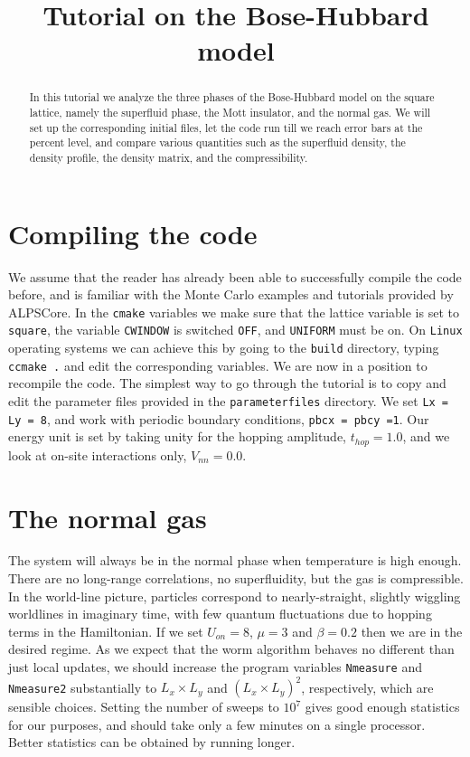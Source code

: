 \documentclass[pra,aps,showpacs,groupedaddress,superscriptaddress,twocolumn,toc=flat]{revtex4-1}
\begin{document}
\title{Tutorial on the Bose-Hubbard model}

\begin{abstract}
In this tutorial we analyze the three phases of the Bose-Hubbard model on the square lattice, namely the superfluid phase, the Mott insulator, and the normal gas.
We will set up the corresponding initial files, let the code run till we reach error bars at the percent level, and compare various quantities such as the superfluid density, the density profile, the density matrix, and the compressibility.


\end{abstract}

\maketitle

\section{Compiling the code}
We assume that the reader has already been able to successfully compile the code before, and is familiar with the Monte Carlo examples and tutorials provided by ALPSCore.
In the \texttt{cmake} variables  we make sure that the lattice variable is set to \texttt{square}, the variable \texttt{CWINDOW} is switched \texttt{OFF}, and \texttt{UNIFORM} must be on. 
On \texttt{Linux} operating systems we can achieve this by going to the \texttt{build} directory, typing \texttt{ccmake .} and edit the corresponding variables. We are now in a position to recompile the code.
The simplest way to go through the tutorial is to copy and edit the parameter files provided in the \texttt{parameterfiles} directory. We set  \texttt{Lx = Ly = 8}, and work with periodic boundary conditions, \texttt{pbcx = pbcy =1}.
Our energy unit is set by taking unity for the hopping amplitude,  \texttt{$t_{hop} = 1.0$}, and we look at on-site interactions only, \texttt{$V_{nn} = 0.0$}.

\section{The normal gas}
The system will always be in the normal phase when temperature is high enough. There are no long-range correlations, no superfluidity, but the gas is compressible. In the world-line picture,
particles correspond to nearly-straight, slightly wiggling worldlines in imaginary time, with few quantum fluctuations due to hopping terms in the Hamiltonian. If we set $U_{on} = 8$, $\mu = 3$ and $\beta = 0.2$ then we are in the desired regime. As we expect that the worm algorithm behaves no different than just local updates, we should increase the program variables  \texttt{Nmeasure} and  \texttt{Nmeasure2} substantially to $L_x \times L_y$ and $(L_x \times L_y)^2$, respectively, which are sensible choices. Setting the number of sweeps to $10^7$ gives good enough statistics for our purposes, and should take only a few minutes on a single processor. Better statistics can be obtained by running longer. \\
\end{document}
